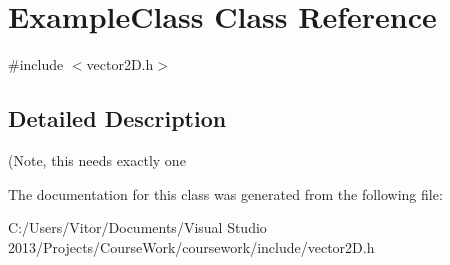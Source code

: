 \hypertarget{class_example_class}{}\section{Example\+Class Class Reference}
\label{class_example_class}


{\ttfamily \#include $<$vector2\+D.\+h$>$}



\subsection{Detailed Description}
(Note, this needs exactly one 

The documentation for this class was generated from the following file\+:\begin{DoxyCompactItemize}
\item 
C\+:/\+Users/\+Vitor/\+Documents/\+Visual Studio 2013/\+Projects/\+Course\+Work/coursework/include/vector2\+D.\+h\end{DoxyCompactItemize}
